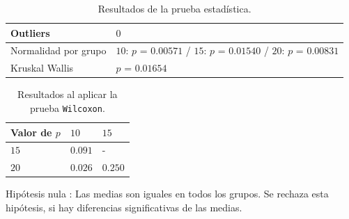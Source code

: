 \documentclass{article}
\begin{document}
\begin{table}[h!]
\centering
\caption{Resultados de la prueba estadística.}
\smallskip

\begin{tabular}{ |p{4cm}|p{8cm}|}
 \hline
 Outliers & $0$ \\
 \hline
 Normalidad por grupo & $10$: $p$ = $0.00571$ / $15$: $p$ = $0.01540$ / $20$: $p$ = $0.00831$ \\
 \hline
 Kruskal Wallis & $p$ = $0.01654$ \\
 \hline
\end{tabular}
\label{Cuadro3}
\end{table}

\begin{table}[h!]
\centering
\caption{Resultados al aplicar la prueba \texttt{Wilcoxon}.}
\smallskip

\begin{tabular}{|p{1.7cm}|p{1.7cm}|p{1.7cm}|}
 \hline
Valor de $p$ & $10$ & $15$ \\
 \hline
 $15$ & $0.091$ & -   \\
 \hline
 $20$ & $0.026$ & $0.250$  \\
 \hline
\end{tabular}
\label{Cuadro4}
\end{table}

Hipótesis nula : Las medias son iguales en todos los grupos. Se rechaza esta hipótesis, si hay diferencias significativas de las medias.
\end{document}
